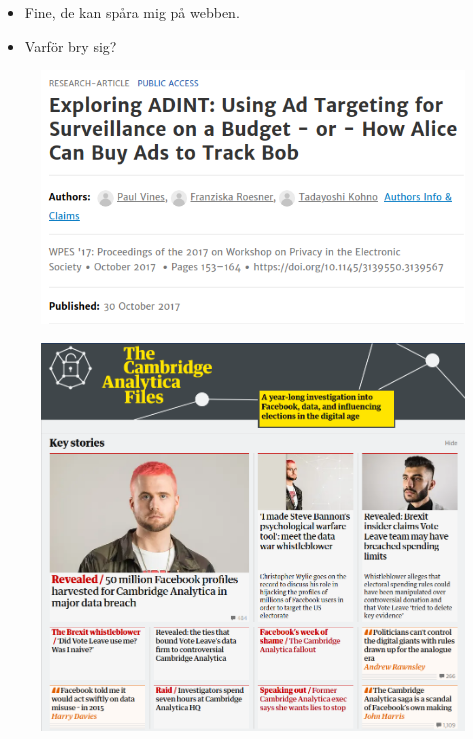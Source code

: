 \begin{frame}
  \begin{question}
    \begin{itemize}
      \item Fine, de kan spåra mig på webben.
      \item Varför bry sig?
    \end{itemize}
  \end{question}
\end{frame}

\begin{frame}
  \begin{figure}
    \includegraphics[width=\columnwidth]{fig/adint.png}
  \end{figure}
\end{frame}

\begin{frame}
  \begin{figure}
    \includegraphics[width=\columnwidth]{fig/analytica.png}
  \end{figure}
\end{frame}

